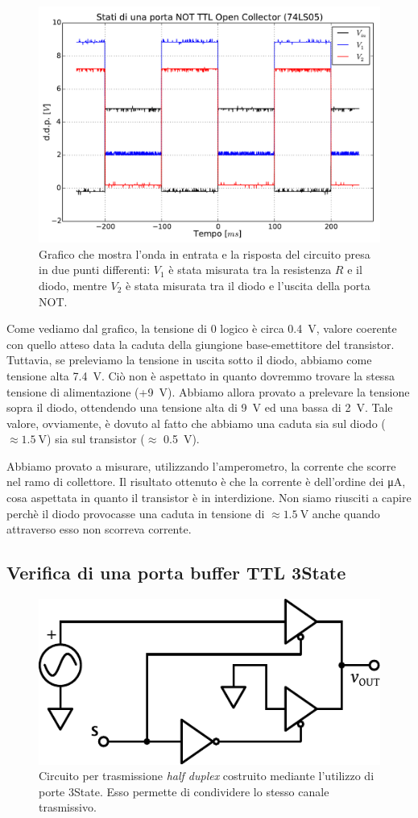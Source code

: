 \begin{figure}[htpc]
\centering
\includegraphics[width=.65\textwidth]{../E10/latex/NOTTTL.pdf}
\caption{Grafico che mostra l'onda in entrata e la risposta del circuito presa in due punti differenti: $V_1$ è stata misurata tra la resistenza $R$ e il diodo, mentre $V_2$ è stata misurata tra il diodo e l'uscita della porta NOT.}
\label{gr10:notttl}
\end{figure}

Come vediamo dal grafico, la tensione di 0 logico è circa \SI{0.4}{\volt}, valore coerente con quello atteso data la caduta della giungione base-emettitore del transistor.
Tuttavia, se preleviamo la tensione in uscita sotto il diodo, abbiamo come tensione alta \SI{7.4}{\V}.
Ciò non è aspettato in quanto dovremmo trovare la stessa tensione di alimentazione (+\SI{9}{\V}).
Abbiamo allora provato a prelevare la tensione sopra il diodo, ottendendo una tensione alta di \SI{9}{\V} ed una bassa di \SI{2}{\V}.
Tale valore, ovviamente, è dovuto al fatto che abbiamo una caduta sia sul diodo ($\approx \SI{1.5}{\V}$) sia sul transistor ($\approx$ \SI{0.5}{\V}).

Abbiamo provato a misurare, utilizzando l'amperometro, la corrente che scorre nel ramo di collettore.
Il risultato ottenuto è che la corrente è dell'ordine dei \si{\micro\ampere}, cosa aspettata  in quanto il transistor è in interdizione.
Non siamo riusciti a capire perchè il diodo provocasse una caduta in tensione di $\approx \SI{1.5}{\volt}$ anche quando attraverso esso non scorreva corrente.

\newpage
\subsection{Verifica di una porta buffer TTL 3State}

\begin{figure}
\centering
\includegraphics[width=.4\textwidth]{../E10/latex/impedence.pdf}
\caption{Circuito per trasmissione \textit{half duplex} costruito mediante l'utilizzo di porte 3State. Esso permette di condividere lo stesso canale trasmissivo.}
\label{cir10:3state}
\end{figure}

